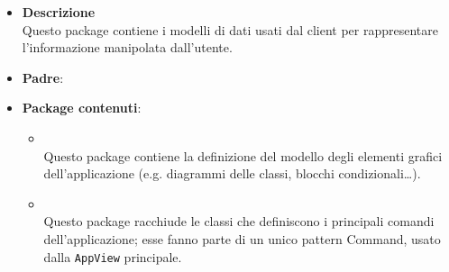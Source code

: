 \FloatBarrier
\begin{itemize}
\item \textbf{Descrizione}\\
Questo package contiene i modelli di dati usati dal client per rappresentare l'informazione manipolata dall'utente.
\item \textbf{Padre}: \hyperref[\nogloxy{swedesigner::client}]{}
\item \textbf{Package contenuti}:
\begin{itemize}
\item \hyperref[\nogloxy{swedesigner::client::model::celltypes}]{}\\
Questo package contiene la definizione del modello degli elementi grafici dell'applicazione (e.g. diagrammi delle classi, blocchi condizionali\dots). 
\item \hyperref[\nogloxy{swedesigner::client::model::utility}]{}\\
Questo package racchiude le classi che definiscono i principali comandi dell'applicazione; esse fanno parte di un unico pattern Command, usato dalla \texttt{AppView} principale.
\end{itemize}
\end{itemize}
